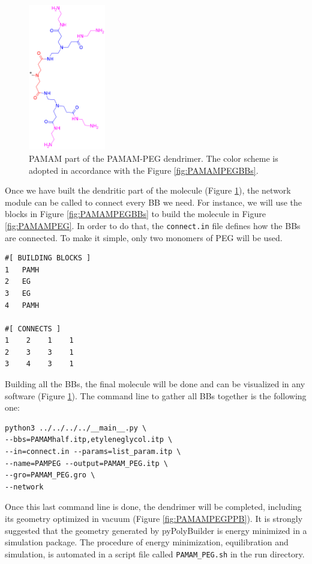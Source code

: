 \begin{figure}
    \centering
    \includegraphics[width=0.3\textwidth]{PAMAM_PEG/PAMAMPEGHalf.png}
    \caption{PAMAM part of the PAMAM-PEG dendrimer. The color scheme is adopted in accordance with the Figure \ref{fig:PAMAMPEGBBs}.}
    \label{fig:PAMAMPEGHalf}
\end{figure}

Once we have built the dendritic part of the molecule (Figure \ref{fig:PAMAMPEGHalf}), the network module can be called to connect every BB we need.
For instance, we will use the blocks in Figure \ref{fig:PAMAMPEGBBs} to build the molecule in Figure \ref{fig:PAMAMPEG}.
In order to do that, the \texttt{connect.in} file defines how the BBs are connected.
To make it simple, only two monomers of PEG will be used.

\begin{lstlisting}
#[ BUILDING BLOCKS ]
1   PAMH
2   EG
3   EG
4   PAMH

#[ CONNECTS ]
1    2    1    1
2    3    3    1
3    4    3    1

\end{lstlisting}

Building all the BBs, the final molecule will be done and can be visualized in any software (Figure \ref{fig:PAMAMPEGHalf}).
The command line to gather all BBs together is the following one:

\begin{lstlisting}
python3 ../../../../__main__.py \
--bbs=PAMAMhalf.itp,etyleneglycol.itp \
--in=connect.in --params=list_param.itp \
--name=PAMPEG --output=PAMAM_PEG.itp \
--gro=PAMAM_PEG.gro \
--network
\end{lstlisting}

Once this last command line is done, the dendrimer will be completed, including its geometry optimized in vacuum (Figure \ref{fig:PAMAMPEGPPB}).
It is strongly suggested that the geometry generated by pyPolyBuilder is energy minimized in a simulation package.
The procedure of energy minimization, equilibration and simulation, is automated in a script file called \texttt{PAMAM\_PEG.sh} in the run directory.

